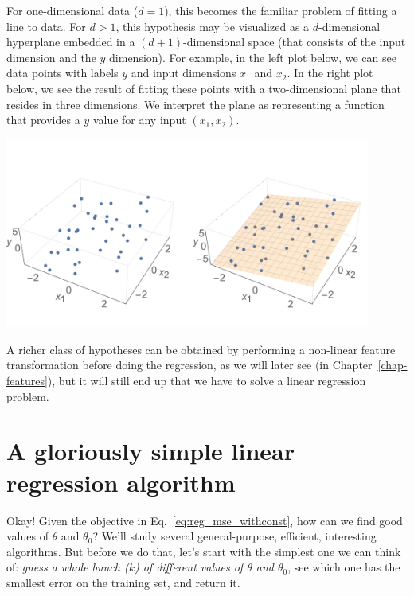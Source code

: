 For
one-dimensional data ($d=1$), this becomes the familiar problem of
fitting a line to data.  For $d>1$, this
hypothesis may be visualized as a $d$-dimensional hyperplane
embedded in a $(d+1)$-dimensional space (that consists of the input
dimension and the $y$ dimension).
For example, in the left plot
below, we can see data points with labels $y$ and input dimensions
$x_1$ and $x_2$. In the right plot below, we see the result of fitting
these points with a two-dimensional plane that resides in three
dimensions.  We interpret the plane as representing a function that
provides a $y$ value for any input $(x_1, x_2)$.

\includegraphics[width=0.9\textwidth]{figures/regression_ex1_plane1.png}

A richer class of hypotheses can be obtained by performing a
non-linear feature transformation before doing the regression, as
we will later see (in Chapter~\ref{chap-features}), but it will still
end up that we have to solve a linear regression problem.



\section{A gloriously simple linear regression algorithm}

Okay!  Given the objective in Eq.~\ref{eq:reg_mse_withconst}, how
can we find good values of $\theta$ and $\theta_0$?  We'll study
several general-purpose, efficient, interesting algorithms.  But
before we do that, let's start with the simplest one we can think of:
{\em guess a whole bunch ($k$) of different values of $\theta$ and
$\theta_0$}, see which one has the smallest error on the training
set, and return it.

